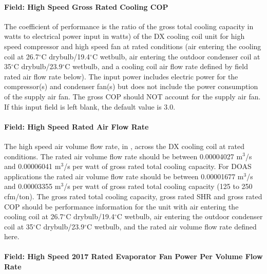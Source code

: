 \paragraph{Field: High Speed Gross Rated Cooling COP}\label{field-high-speed-gross-rated-cooling-cop}

The coefficient of performance is the ratio of the gross total cooling capacity in watts to electrical power input in watts) of the DX cooling coil unit for high speed compressor and high speed fan at rated conditions (air entering the cooling coil at 26.7$^\circ$C drybulb/19.4$^\circ$C wetbulb, air entering the outdoor condenser coil at 35$^\circ$C drybulb/23.9$^\circ$C wetbulb, and a cooling coil air flow rate defined by field rated air flow rate below). The input power includes electric power for the compressor(s) and condenser fan(s) but does not include the power consumption of the supply air fan. The gross COP should NOT account for the supply air fan. If this input field is left blank, the default value is 3.0.

\paragraph{Field: High Speed Rated Air Flow Rate}\label{field-high-speed-rated-air-flow-rate}

The high speed air volume flow rate, in \si{\volumeFlowRate}, across the DX cooling coil at rated conditions. The rated air volume flow rate should be between 0.00004027 m\(^{3}\)/s and 0.00006041 m\(^{3}\)/s per watt of gross rated total cooling capacity. For DOAS applications the rated air volume flow rate should be between 0.00001677 m\(^{3}\)/s and 0.00003355 m\(^{3}\)/s per watt of gross rated total cooling capacity (125 to 250 cfm/ton). The gross rated total cooling capacity, gross rated SHR and gross rated COP should be performance information for the unit with air entering the cooling coil at 26.7$^\circ$C drybulb/19.4$^\circ$C wetbulb, air entering the outdoor condenser coil at 35$^\circ$C drybulb/23.9$^\circ$C wetbulb, and the rated air volume flow rate defined here.

\paragraph{Field: High Speed 2017 Rated Evaporator Fan Power Per Volume Flow Rate}

